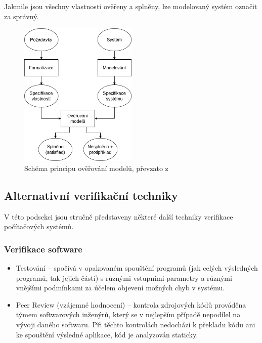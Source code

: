 Jakmile jsou všechny vlastnosti ověřeny a splněny, lze modelovaný systém označit za správný.

\begin{figure}[H]
    \centering
    \includegraphics[width=0.5\textwidth]{obrazky-figures/model_checking_scheme.png}
    \caption{Schéma principu ověřování modelů, převzato z \cite{quantitative_analysis}}
    \label{fig:mc_scheme}
\end{figure}

\subsection{Alternativní verifikační techniky}
V této podsekci jsou stručně představeny některé další techniky verifikace počítačových systémů.

\subsubsection{Verifikace software}
\begin{itemize}
    \item Testování -- spočívá v opakovaném spouštění programů (jak celých výsledných programů, tak jejich částí) s různými vstupními parametry a různými vnějšími podmínkami za účelem objevení možných chyb v systému.
    \item Peer Review (vzájemné hodnocení) -- kontrola zdrojových kódů prováděna týmem softwarových inženýrů, který se v nejlepším případě nepodílel na vývoji daného softwaru. Při těchto kontrolách nedochází k překladu kódu ani ke spouštění výsledné aplikace, kód je analyzován staticky.
\end{itemize}

